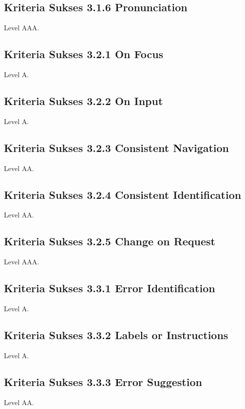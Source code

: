 \subsection{Kriteria Sukses 3.1.6 Pronunciation}
\label{sec:kriteria_3.1.6}
Level AAA.

\subsection{Kriteria Sukses 3.2.1 On Focus}
\label{sec:kriteria_3.2.1}
Level A.

\subsection{Kriteria Sukses 3.2.2 On Input}
\label{sec:kriteria_3.2.2}
Level A.

\subsection{Kriteria Sukses 3.2.3 Consistent Navigation}
\label{sec:kriteria_3.2.3}
Level AA.

\subsection{Kriteria Sukses 3.2.4 Consistent Identification}
\label{sec:kriteria_3.2.4}
Level AA.

\subsection{Kriteria Sukses 3.2.5 Change on Request}
\label{sec:kriteria_3.2.5}
Level AAA.

\subsection{Kriteria Sukses 3.3.1 Error Identification}
\label{sec:kriteria_3.3.1}
Level A.

\subsection{Kriteria Sukses 3.3.2 Labels or Instructions}
\label{sec:kriteria_3.3.2}
Level A.

\subsection{Kriteria Sukses 3.3.3 Error Suggestion}
\label{sec:kriteria_3.3.3}
Level AA.

